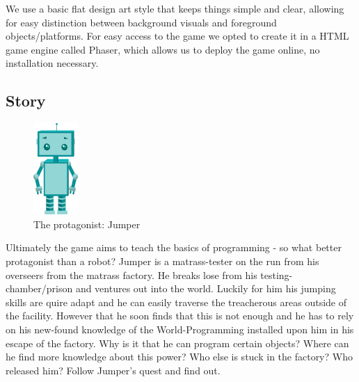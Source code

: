 \documentclass[a4paper,twoside,12pt]{article}
\begin{document}
We use a basic flat design art style that keeps things simple and clear, allowing for easy distinction between background visuals and foreground objects/platforms. For easy access to the game we opted to create it in a HTML game engine called Phaser, which allows us to deploy the game online, no installation necessary.

\subsection{Story}

\begin{figure}[h]
\centering
\includegraphics[scale=1.5]{jumper}
\caption{The protagonist: Jumper}
\end{figure}

Ultimately the game aims to teach the basics of programming - so what better protagonist than a robot?
Jumper is a matrass-tester on the run from his overseers from the matrass factory. He breaks lose from his testing-chamber/prison and ventures out into the world. Luckily for him his jumping skills are quire adapt and he can easily traverse the treacherous areas outside of the facility. However that he soon finds that this is not enough and he has to rely on his new-found knowledge of the World-Programming installed upon him in his escape of the factory. Why is it that he can program certain objects? Where can he find more knowledge about this power? Who else is stuck in the factory? Who released him? Follow Jumper's quest and find out.
\end{document}
